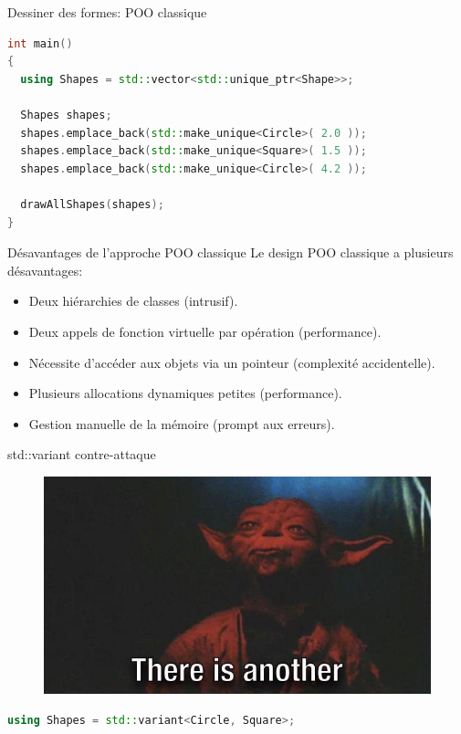 \documentclass[french]{beamer}
\begin{document}
\begin{frame}[fragile]{Dessiner des formes: POO classique}
    \begin{lstlisting}[language=C++]
int main()
{
  using Shapes = std::vector<std::unique_ptr<Shape>>;
 
  Shapes shapes;
  shapes.emplace_back(std::make_unique<Circle>( 2.0 ));
  shapes.emplace_back(std::make_unique<Square>( 1.5 ));
  shapes.emplace_back(std::make_unique<Circle>( 4.2 ));
 
  drawAllShapes(shapes);
}
    \end{lstlisting}
\end{frame}

\begin{frame}{Désavantages de l'approche POO classique}
    Le design POO classique a plusieurs désavantages:
    \begin{itemize}
        \item Deux hiérarchies de classes (intrusif).
        \item Deux appels de fonction virtuelle par opération (performance).
        \item Nécessite d'accéder aux objets via un pointeur (complexité accidentelle).
        \item Plusieurs allocations dynamiques petites (performance).
        \item Gestion manuelle de la mémoire (prompt aux erreurs).
    \end{itemize}
\end{frame}

\begin{frame}[fragile]{std::variant contre-attaque}
    \begin{figure}
        \includegraphics[width=0.7\linewidth]{yoda.jpg}
    \end{figure}
    \begin{lstlisting}[language=C++, basicstyle=\normalsize]
using Shapes = std::variant<Circle, Square>;
    \end{lstlisting}
\end{frame}
\end{document}

